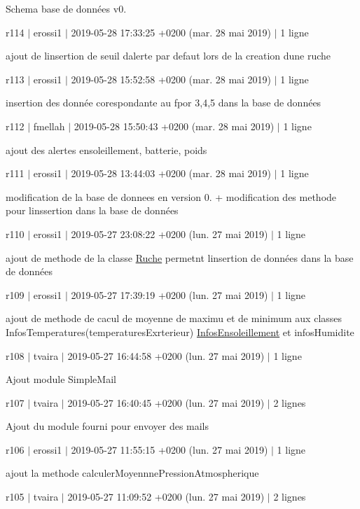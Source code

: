Schema base de données v0.

r114 $\vert$ erossi1 $\vert$ 2019-\/05-\/28 17\+:33\+:25 +0200 (mar. 28 mai 2019) $\vert$ 1 ligne

ajout de l\textquotesingle{}insertion de seuil d\textquotesingle{}alerte par defaut lors de la creation d\textquotesingle{}une ruche

r113 $\vert$ erossi1 $\vert$ 2019-\/05-\/28 15\+:52\+:58 +0200 (mar. 28 mai 2019) $\vert$ 1 ligne

insertion des donnée corespondante au fpor 3,4,5 dans la base de données

r112 $\vert$ fmellah $\vert$ 2019-\/05-\/28 15\+:50\+:43 +0200 (mar. 28 mai 2019) $\vert$ 1 ligne

ajout des alertes ensoleillement, batterie, poids

r111 $\vert$ erossi1 $\vert$ 2019-\/05-\/28 13\+:44\+:03 +0200 (mar. 28 mai 2019) $\vert$ 1 ligne

modification de la base de donnees en version 0. + modification des methode pour l\textquotesingle{}inssertion dans la base de données

r110 $\vert$ erossi1 $\vert$ 2019-\/05-\/27 23\+:08\+:22 +0200 (lun. 27 mai 2019) $\vert$ 1 ligne

ajout de methode de la classe \hyperlink{class_ruche}{Ruche} permetnt l\textquotesingle{}insertion de données dans la base de données

r109 $\vert$ erossi1 $\vert$ 2019-\/05-\/27 17\+:39\+:19 +0200 (lun. 27 mai 2019) $\vert$ 1 ligne

ajout de methode de cacul de moyenne de maximu et de minimum aux classes Infos\+Temperatures(temperatures\+Exrterieur) \hyperlink{class_infos_ensoleillement}{Infos\+Ensoleillement} et infos\+Humidite

r108 $\vert$ tvaira $\vert$ 2019-\/05-\/27 16\+:44\+:58 +0200 (lun. 27 mai 2019) $\vert$ 1 ligne

Ajout module Simple\+Mail

r107 $\vert$ tvaira $\vert$ 2019-\/05-\/27 16\+:40\+:45 +0200 (lun. 27 mai 2019) $\vert$ 2 lignes

Ajout du module fourni pour envoyer des mails

r106 $\vert$ erossi1 $\vert$ 2019-\/05-\/27 11\+:55\+:15 +0200 (lun. 27 mai 2019) $\vert$ 1 ligne

ajout la methode calculer\+Moyennne\+Pression\+Atmospherique

r105 $\vert$ tvaira $\vert$ 2019-\/05-\/27 11\+:09\+:52 +0200 (lun. 27 mai 2019) $\vert$ 2 lignes

